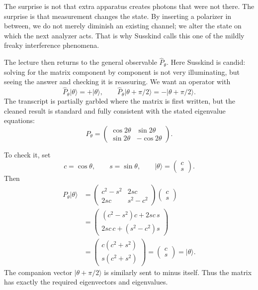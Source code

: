 The surprise is not that extra apparatus creates photons that were not there. The surprise is that measurement changes the state. By inserting a polarizer in between, we do not merely diminish an existing channel; we alter the state on which the next analyzer acts. That is why Susskind calls this one of the mildly freaky interference phenomena.

The lecture then returns to the general observable \(\hat P_\theta\). Here Susskind is candid: solving for the matrix component by component is not very illuminating, but seeing the answer and checking it is reassuring. We want an operator with
\begin{equation}
\hat P_\theta|\theta\rangle=+|\theta\rangle,
\qquad
\hat P_\theta|\theta+\pi/2\rangle=-|\theta+\pi/2\rangle.
\end{equation}
The transcript is partially garbled where the matrix is first written, but the cleaned result is standard and fully consistent with the stated eigenvalue equations:
\begin{equation}
P_\theta=
\begin{pmatrix}
\cos 2\theta & \sin 2\theta\\
\sin 2\theta & -\cos 2\theta
\end{pmatrix}.
\end{equation}

To check it, set
\begin{equation}
c=\cos\theta,
\qquad
s=\sin\theta,
\qquad
|\theta\rangle=
\begin{pmatrix}
c\\
s
\end{pmatrix}.
\end{equation}
Then
\begin{align}
P_\theta|\theta\rangle
&=
\begin{pmatrix}
c^2-s^2 & 2sc\\
2sc & s^2-c^2
\end{pmatrix}
\begin{pmatrix}
c\\
s
\end{pmatrix} \\
&=
\begin{pmatrix}
(c^2-s^2)c+2sc\,s\\
2sc\,c+(s^2-c^2)s
\end{pmatrix} \\
&=
\begin{pmatrix}
c(c^2+s^2)\\
s(c^2+s^2)
\end{pmatrix}
=
\begin{pmatrix}
c\\
s
\end{pmatrix}
=
|\theta\rangle.
\end{align}
The companion vector \(|\theta+\pi/2\rangle\) is similarly sent to minus itself. Thus the matrix has exactly the required eigenvectors and eigenvalues.

